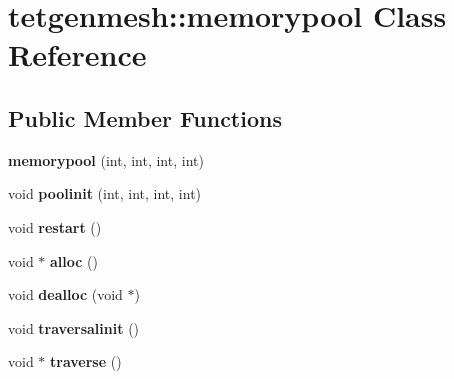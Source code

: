 \hypertarget{classtetgenmesh_1_1memorypool}{}\section{tetgenmesh\+:\+:memorypool Class Reference}
\label{classtetgenmesh_1_1memorypool}
\subsection*{Public Member Functions}
\begin{DoxyCompactItemize}
\item 
\mbox{\label{classtetgenmesh_1_1memorypool_a11c634d40b58e7a23cffb0ca1e9fcbec}} 
{\bfseries memorypool} (int, int, int, int)
\item 
\mbox{\label{classtetgenmesh_1_1memorypool_af1e55812acd2838a7566ea97f7af85c1}} 
void {\bfseries poolinit} (int, int, int, int)
\item 
\mbox{\label{classtetgenmesh_1_1memorypool_a8a34eeaa526e3a27ac9187ff1ead2938}} 
void {\bfseries restart} ()
\item 
\mbox{\label{classtetgenmesh_1_1memorypool_a9631e38a788a91ae067a756232b515ab}} 
void $\ast$ {\bfseries alloc} ()
\item 
\mbox{\label{classtetgenmesh_1_1memorypool_a0329d16675985efd7fd1e0a0630cabf7}} 
void {\bfseries dealloc} (void $\ast$)
\item 
\mbox{\label{classtetgenmesh_1_1memorypool_a623b101e4e2f249d8b7e5dba65c3f7e2}} 
void {\bfseries traversalinit} ()
\item 
\mbox{\label{classtetgenmesh_1_1memorypool_a151fe73459d0fa9a7262d0030fecf291}} 
void $\ast$ {\bfseries traverse} ()
\end{DoxyCompactItemize}
